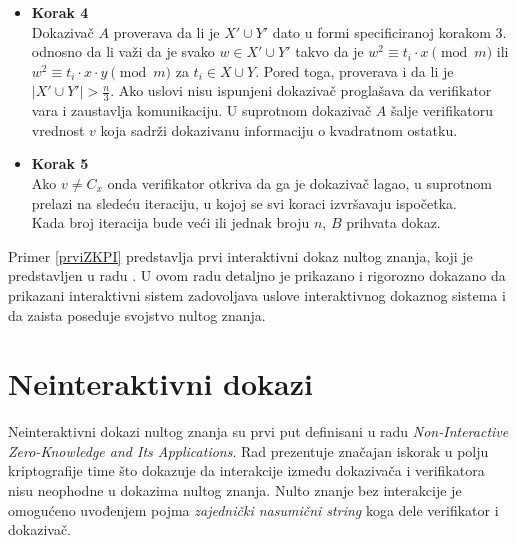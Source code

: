 \begin{npra}
\begin{itemize}
		Ako je $x\equiv r_{0}^{2} \pmod \ m$:
		$$X' = \{r_{0} \cdot r_{i} \equiv \sqrt{x \cdot t_{i}} \pmod n \ | \ t_{i} \in X\}$$
		$$Y' = \{y\cdot r_{0} \cdot r_{i} \equiv \sqrt{y \cdot x \cdot t_{i}} \pmod n \ | \ t_{i} \in Y\}$$
		Dok ako je $x\equiv y\cdot r_{0}^{2} \pmod \ m$:
		$$X' = \{y\cdot r_{0} \cdot r_{i} \equiv \sqrt{y \cdot x \cdot t_{i}} \pmod n \ | \ t_{i} \in X\}$$
		$$Y' = \{y\cdot r_{0} \cdot r_{i} \equiv \sqrt{x \cdot t_{i}} \pmod n \ | \ t_{i} \in Y\}$$
		Nakon kreiranja ova dva skupa, verifikator šalje dokazivaču njihovu uniju $X'\cup Y'$ u nasumičnom redosledu.
		\item {\bf Korak 4} \\
		Dokazivač $A$ proverava da li je $X'\cup Y'$ dato u formi  specificiranoj korakom 3. odnosno da li važi da je svako $w \in X'\cup Y'$ takvo da je  $w^{2} \equiv t_{i}\cdot x \pmod m$ ili $w^{2} \equiv t_{i}\cdot x \cdot y \pmod m$ za $t_{i} \in X \cup Y$. Pored toga, proverava i da li je $|X'\cup Y'| > \frac{n}{3}$. Ako uslovi nisu ispunjeni dokazivač proglašava da  verifikator vara i zaustavlja komunikaciju. U suprotnom dokazivač $A$ šalje verifikatoru vrednost $v$ koja sadrži dokazivanu informaciju o kvadratnom ostatku.
		\item {\bf Korak 5} \\
		Ako $v \neq C_{x}$ onda verifikator otkriva da ga je dokazivač lagao, u suprotnom prelazi na sledeću iteraciju,  u kojoj se svi koraci izvršavaju ispočetka.\\
		Kada broj iteracija bude veći ili jednak broju $n$, $B$ prihvata dokaz.
	\end{itemize}
\label{prviZKPI}
\end{npra}
Primer \ref{prviZKPI} predstavlja prvi interaktivni dokaz nultog znanja, koji je predstavljen u radu \cite{mathBook}. U ovom radu detaljno je prikazano i rigorozno dokazano da prikazani interaktivni sistem zadovoljava uslove interaktivnog dokaznog sistema i da zaista poseduje svojstvo nultog znanja.



\chapter{Neinteraktivni dokazi}
Neinteraktivni dokazi nultog znanja su prvi put definisani u radu \textenglish{\it Non-Interactive Zero-Knowledge and Its Applications}. Rad  prezentuje značajan iskorak u polju kriptografije time što dokazuje da interakcije između dokazivača i verifikatora nisu neophodne u dokazima nultog znanja. Nulto znanje bez interakcije je omogućeno uvođenjem pojma {\it zajednički nasumični string} koga dele verifikator i dokazivač\cite{10.1145/62212.62222}.


